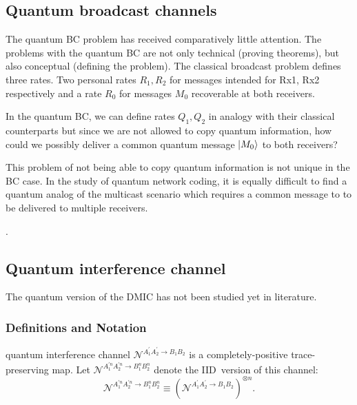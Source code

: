 \documentclass[aps,11pt,twoside,letterpaper]{article}
\begin{document}
		

	\subsection{Quantum broadcast channels}


		The quantum BC problem has received comparatively little attention.
		The problems with the quantum BC are not only technical (proving theorems), 
		but also conceptual (defining the problem).
		The classical broadcast problem defines three rates. 
		Two personal rates  $R_1,R_2$ for messages intended for Rx1, Rx2 respectively
		and a rate $R_0$ for messages $M_0$ recoverable at both receivers.

		In the quantum BC, we can define rates $Q_1,Q_2$ in analogy with their
		classical counterparts but since we are not allowed to copy quantum information,
		how could we possibly deliver a common quantum message $| M_0 \rangle$ to both receivers?
		
		This problem of not being able to copy quantum information is not
		unique in the BC case. 
		In the study of quantum network coding, it is equally difficult to find a 
		quantum analog of the multicast scenario which requires a common message
		to to be delivered to multiple receivers.
		
		
		
		\cite{YHD2006}
		
		\cite{DH2006}.

		


	
	\subsection{Quantum interference channel}


		The quantum version of the DMIC has not been studied yet in literature. 


		\subsubsection{Definitions and Notation}

		quantum interference channel $\mathcal{N}^{A_{1}^{\prime}A_{2}^{\prime
		}\rightarrow B_{1}B_{2}}$ is a completely-positive trace-preserving map. Let
		$\mathcal{N}^{A_{1}^{\prime n}A_{2}^{\prime n}\rightarrow B_{1}^{n}B_{2}^{n}}$
		denote the IID\ version of this channel:%
		\[
		\mathcal{N}^{A_{1}^{\prime n}A_{2}^{\prime n}\rightarrow B_{1}^{n}B_{2}^{n}%
		}\equiv(\mathcal{N}^{A_{1}^{\prime}A_{2}^{\prime}\rightarrow B_{1}B_{2}%
		})^{\otimes n}.
		\]
\end{document}

